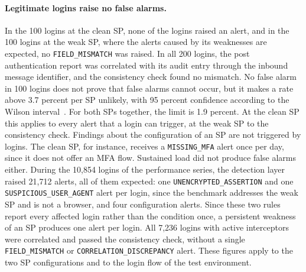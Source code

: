 \documentclass[../main.tex]{subfiles}
\begin{document}
\paragraph{Legitimate logins raise no false alarms.}
In the 100 logins at the clean SP, none of the logins raised an alert, and in the 100 logins at the 
weak SP, where the alerts caused by its weaknesses are expected, no 
\texttt{FIELD\_\allowbreak{}MISMATCH} was raised. 
In all 200 logins, the post authentication report was correlated with its audit entry through the 
inbound message identifier, and the consistency check found no mismatch. 
No false alarm in 100 logins does not prove that false alarms cannot occur, but it makes a rate 
above 3.7 percent per SP unlikely, with 95 percent confidence according to the Wilson 
interval~\cite{Wilson}. 
For both SPs together, the limit is 1.9 percent. 
At the clean SP this applies to every alert that a login can trigger, at the weak SP to the 
consistency check. 
Findings about the configuration of an SP are not triggered by logins. 
The clean SP, for instance, receives a \texttt{MISSING\_\allowbreak{}MFA} alert once per day, since it 
does not offer an MFA flow. 
Sustained load did not produce false alarms either. 
During the 10{,}854 logins of the performance series, the detection layer raised 21{,}712 alerts, 
all of them expected: one \texttt{UNENCRYPTED\_\allowbreak{}ASSERTION} and one 
\texttt{SUSPICIOUS\_\allowbreak{}USER\_\allowbreak{}AGENT} alert per login, since the benchmark 
addresses the weak SP and is not a browser, and four configuration alerts. 
Since these two rules report every affected login rather than the condition once, a persistent 
weakness of an SP produces one alert per login. 
All 7{,}236 logins with active interceptors were correlated and passed the consistency check, 
without a single \texttt{FIELD\_\allowbreak{}MISMATCH} or \texttt{CORRELATION\_\allowbreak{}DISCREPANCY} alert. 
These figures apply to the two SP configurations and to the login flow of the test environment. 
\end{document}
